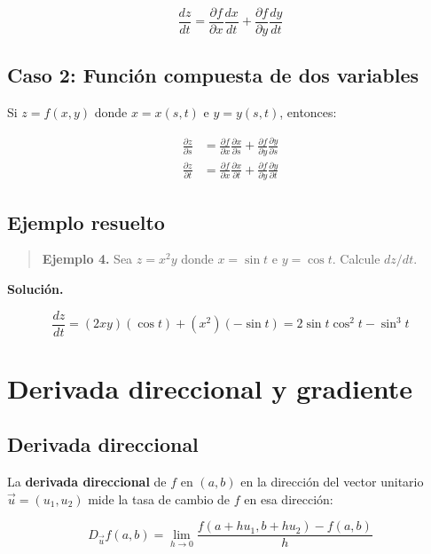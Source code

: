 \documentclass[
]{book}
\begin{document}
\[
\frac{dz}{dt} = \frac{\partial f}{\partial x}\frac{dx}{dt} + \frac{\partial f}{\partial y}\frac{dy}{dt}
\]

\subsection{Caso 2: Función compuesta de dos variables}\label{caso-2-funciuxf3n-compuesta-de-dos-variables}

Si \(z = f(x, y)\) donde \(x = x(s, t)\) e \(y = y(s, t)\), entonces:

\[
\begin{aligned}
\frac{\partial z}{\partial s} &= \frac{\partial f}{\partial x}\frac{\partial x}{\partial s} + \frac{\partial f}{\partial y}\frac{\partial y}{\partial s} \\
\frac{\partial z}{\partial t} &= \frac{\partial f}{\partial x}\frac{\partial x}{\partial t} + \frac{\partial f}{\partial y}\frac{\partial y}{\partial t}
\end{aligned}
\]

\subsection{Ejemplo resuelto}\label{ejemplo-resuelto-11}

\begin{quote}
\textbf{Ejemplo 4.} Sea \(z = x^2 y\) donde \(x = \sin t\) e \(y = \cos t\). Calcule \(dz/dt\).
\end{quote}

\textbf{Solución.}

\[
\frac{dz}{dt} = (2xy)(\cos t) + (x^2)(-\sin t) = 2\sin t \cos^2 t - \sin^3 t
\]

\section{Derivada direccional y gradiente}\label{derivada-direccional-y-gradiente}

\subsection{Derivada direccional}\label{derivada-direccional}

La \textbf{derivada direccional} de \(f\) en \((a, b)\) en la dirección del vector unitario \(\vec{u} = (u_1, u_2)\) mide la tasa de cambio de \(f\) en esa dirección:

\[
D_{\vec{u}} f(a, b) = \lim_{h \to 0} \frac{f(a + hu_1, b + hu_2) - f(a, b)}{h}
\]
\end{document}
